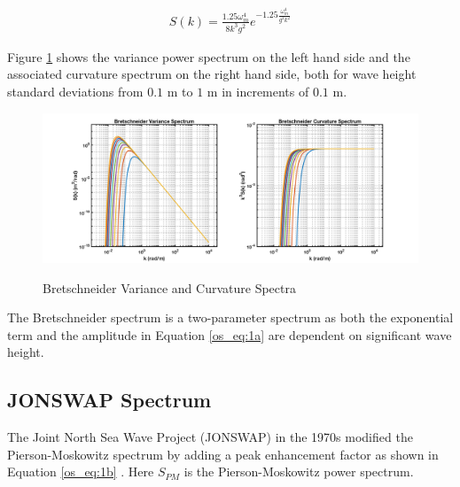\begin{equation}
  \begin{gathered}
  \label{os_eq:1a}
  S(k) = \frac{1.25 \omega_m^4}{8k^3g^2}e^{-1.25\frac{\omega_m^4}{g^2k^2}} 
  \end{gathered}
\end{equation}
\renewcommand{\baselinestretch}{2} \small\normalsize

Figure \ref{os_fig:1a} shows the variance power spectrum on the left hand side and the associated curvature spectrum on the right hand side, both for wave height standard deviations from $0.1$ m to $1$ m in increments of $0.1$ m.

 \begin{figure}[ht]
  \begin{center}
\includegraphics[width=6in]{../media/Ocean_Surface/bs_variance_curvature_spectrum.png}
  \end{center}
  \renewcommand{\baselinestretch}{1} \small\normalsize
  \begin{quote}
    \caption[Bretschneider Variance and Curvature Spectra]{Bretschneider Variance and Curvature Spectra\label{os_fig:1a}}
  \end{quote}
\end{figure}
 \renewcommand{\baselinestretch}{2} \small\normalsize
 
The Bretschneider spectrum is a two-parameter spectrum as both the exponential term and the amplitude in Equation \ref{os_eq:1a} are dependent on significant wave height.

\subsection {JONSWAP Spectrum}
The Joint North Sea Wave Project (JONSWAP) in the 1970s modified the Pierson-Moskowitz spectrum by adding a peak enhancement factor as shown in Equation \ref{os_eq:1b} \cite{michel_sea_spectra}. Here $S_{PM}$ is the Pierson-Moskowitz power spectrum.

